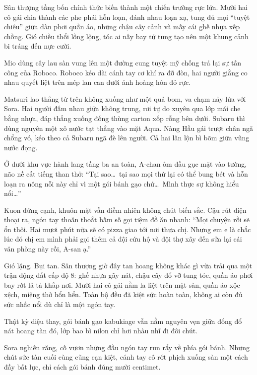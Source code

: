\documentclass[../main.tex]{subfiles}
\begin{document}
Sân thượng tầng bốn chính thức biến thành một chiến trường rực lửa. Mười hai cô gái chia thành các phe phái hỗn loạn, đánh nhau loạn xạ, tung đủ mọi ``tuyệt chiêu'' giữa dàn phơi quần áo, những chậu cây cảnh và mấy cái ghế nhựa xếp chồng. Gió chiều thổi lồng lộng, tóc ai nấy bay tứ tung tạo nên một khung cảnh bi tráng đến nực cười.

Mio dùng cây lau sàn vung lên một đường cung tuyệt mỹ chống trả lại sự tấn công của Roboco. Roboco kéo dài cánh tay cơ khí ra đỡ đòn, hai người giằng co nhau quyết liệt trên mép lan can dưới ánh hoàng hôn đỏ rực.

Matsuri lao thẳng từ trên không xuống như một quả bom, va chạm nảy lửa với Sora. Hai người đấm nhau giữa không trung, rơi tự do xuyên qua lớp mái che bằng nhựa, đáp thẳng xuống đống thùng carton xốp rỗng bên dưới. Subaru thì dùng nguyên một xô nước tạt thẳng vào mặt Aqua. Nàng Hầu gái trượt chân ngã chổng vó, kéo theo cả Subaru ngã đè lên người. Cả hai lăn lộn bì bõm giữa vũng nước đọng.

Ở dưới khu vực hành lang tầng ba an toàn, A-chan ôm đầu gục mặt vào tường, não nề cất tiếng than thở:
``Tại sao\dots\ tại sao mọi thứ lại có thể bung bét và hỗn loạn ra nông nỗi này chỉ vì một gói bánh gạo chứ\dots\ Mình thực sự không hiểu nổi\dots''

Kuon đứng cạnh, khuôn mặt vẫn điềm nhiên không chút biến sắc. Cậu rút điện thoại ra, ngón tay thoăn thoắt bấm số gọi tiệm đồ ăn nhanh:
``Mọi chuyện rồi sẽ ổn thôi. Hai mươi phút nữa sẽ có pizza giao tới nơi thưa chị. Nhưng em e là chắc lúc đó chị em mình phải gọi thêm cả đội cứu hộ và đội thợ xây đến sửa lại cái văn phòng này rồi, A-san ạ.''

\ct

Gió lặng. Bụi tan. Sân thượng giờ đây tan hoang không khác gì vừa trải qua một trận động đất cấp độ 8: ghế nhựa gãy nát, chậu cây đổ vỡ tung tóe, quần áo phơi bay rớt lả tả khắp nơi. Mười hai cô gái nằm la liệt trên mặt sàn, quần áo xộc xệch, miệng thở hổn hển. Toàn bộ đều đã kiệt sức hoàn toàn, không ai còn đủ sức nhấc nổi dù chỉ là một ngón tay.

Thật kỳ diệu thay, gói bánh gạo kabukiage vẫn nằm nguyên vẹn giữa đống đổ nát hoang tàn đó, lớp bao bì nilon chỉ hơi nhàu nhĩ đi đôi chút.

Sora nghiến răng, cố vươn những đầu ngón tay run rẩy về phía gói bánh. Nhưng chút sức tàn cuối cùng cũng cạn kiệt, cánh tay cô rớt phịch xuống sàn một cách đầy bất lực, chỉ cách gói bánh đúng mười centimet.
\end{document}
